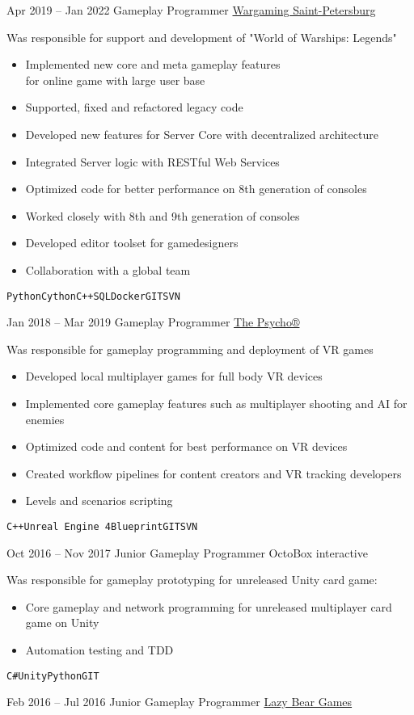 \documentclass[9pt]{developercv} %
\begin{document}
\begin{entrylist}
	\entry
	{Apr 2019 -- Jan 2022}
	{Gameplay Programmer}
	{\href{https://na.wargaming.net/en/games/wowsconsole}{Wargaming Saint-Petersburg}}
	{

		Was responsible for support and development of "World of Warships: Legends"
		\begin{itemize}
			\item Implemented new core and meta gameplay features \\for online game with large user base
			\item Supported, fixed and refactored legacy code
			\item Developed new features for Server Core with decentralized architecture
			\item Integrated Server logic with RESTful Web Services
			\item Optimized code for better performance on 8th generation of consoles
			\item Worked closely with 8th and 9th generation of consoles
			\item Developed editor toolset for gamedesigners
			\item Collaboration with a global team
		\end{itemize}
		\texttt{Python}\slashsep\texttt{Cython}\slashsep\texttt{C++}\slashsep\texttt{SQL}\slashsep\texttt{Docker}\slashsep\texttt{GIT}\slashsep\texttt{SVN}}
	\entry
	{Jan 2018 -- Mar 2019}
	{Gameplay Programmer}
	{\href{https://www.thepsycho.net/}{The Psycho®}}
	{

	Was responsible for gameplay programming and deployment of VR games
	\begin{itemize}
		\item Developed local multiplayer games for full body VR devices
		\item Implemented core gameplay features such as multiplayer shooting and AI for enemies
		\item Optimized code and content for best performance on VR devices
		\item Created workflow pipelines for content creators and VR tracking developers
		\item Levels and scenarios scripting
	\end{itemize}
	{\texttt{C++}\slashsep\texttt{Unreal Engine 4}\slashsep\texttt{Blueprint}\slashsep\texttt{GIT}\slashsep\texttt{SVN}}
	}
	\entry
	{Oct 2016 -- Nov 2017}
	{Junior Gameplay Programmer}
	{OctoBox interactive}
	{

	Was responsible for gameplay prototyping for unreleased Unity card game:
	\begin{itemize}
		\item Core gameplay and network programming for unreleased multiplayer card game on Unity
		\item Automation testing and TDD
	\end{itemize}
	{\texttt{C\#}\slashsep\texttt{Unity}\slashsep\texttt{Python}\slashsep\texttt{GIT}}
	}
	\entry
	{Feb 2016 -- Jul 2016}
	{Junior Gameplay Programmer}
	{\href{http://lazybeargames.com/}{Lazy Bear Games}}
	{

}
\end{entrylist}
\end{document}
